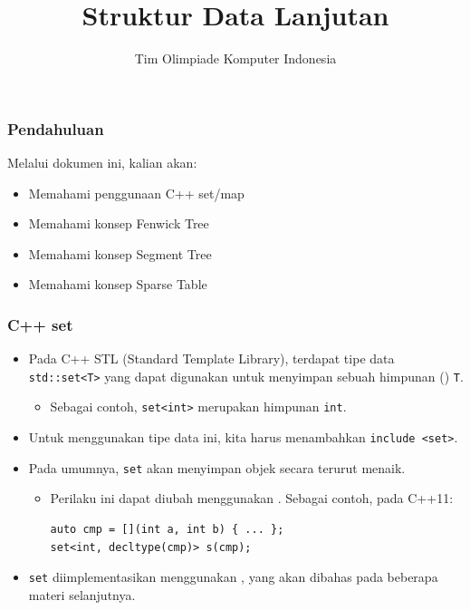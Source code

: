 

\title{Struktur Data Lanjutan}
\author{Tim Olimpiade Komputer Indonesia}
\date{}



\begin{frame}
\titlepage
\end{frame}

\begin{frame}
\frametitle{Pendahuluan}
Melalui dokumen ini, kalian akan:
\begin{itemize}
  \item Memahami penggunaan C++ set/map
  \item Memahami konsep Fenwick Tree
  \item Memahami konsep Segment Tree
  \item Memahami konsep Sparse Table
\end{itemize}
\end{frame}

\begin{frame}[fragile]
\frametitle{C++ set}
\begin{itemize}
  \item Pada C++ STL (Standard Template Library), terdapat tipe data \lstinline{std::set<T>} yang dapat digunakan untuk menyimpan sebuah himpunan (\fset) \lstinline{T}.
  \begin{itemize}
    \item Sebagai contoh, \lstinline{set<int>} merupakan himpunan \lstinline{int}.
  \end{itemize}
  \item Untuk menggunakan tipe data ini, kita harus menambahkan \lstinline{include <set>}.
  \item Pada umumnya, \lstinline{set} akan menyimpan objek secara terurut menaik.
  \begin{itemize}
    \item Perilaku ini dapat diubah menggunakan . Sebagai contoh, pada C++11:
\begin{lstlisting}
auto cmp = [](int a, int b) { ... };
set<int, decltype(cmp)> s(cmp);
\end{lstlisting}
  \end{itemize}
  \item \lstinline{set} diimplementasikan menggunakan \xspace, yang akan dibahas pada beberapa materi selanjutnya.
\end{itemize}
\end{frame}

